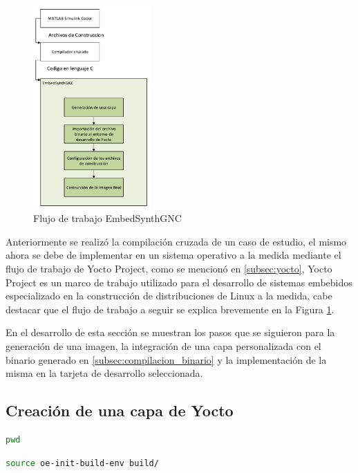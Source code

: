 \begin{figure}[h!]
    \centering
    \includegraphics[width=0.4\textwidth]{fig/especifico_2/embedsynthgnc/diagrama_general_embedsynthgnc.pdf}
    \caption{Flujo de trabajo EmbedSynthGNC}
    \label{fig:diagrama_embed_synth_gnc}
\end{figure}

Anteriormente se realizó la compilación cruzada de un caso de estudio, el mismo ahora se debe de implementar en un sistema operativo a la medida mediante el flujo de trabajo de Yocto Project, como se mencionó en \ref{subsec:yocto}, Yocto Project es un marco de trabajo utilizado para el desarrollo de sistemas embebidos especializado en la construcción de distribuciones de Linux a la medida, cabe destacar que el flujo de trabajo a seguir se explica brevemente en la Figura \ref{fig:diagrama_embed_synth_gnc}. 

En el desarrollo de esta sección se muestran los pasos que se siguieron para la generación de una imagen, la integración de una capa personalizada con el binario generado en \ref{subsec:compilacion_binario} y la implementación de la misma en la tarjeta de desarrollo seleccionada.

\subsection{Creación de una capa de Yocto}

\begin{lstlisting}[language=bash, caption={"Print Working Directory",Linux}, label=lst:pwd]
    pwd
\end{lstlisting}

\begin{lstlisting}[language=bash, caption={Inicializar ambiente, Yocto}, label=lst:yocto_ambient_set]
    source oe-init-build-env build/
\end{lstlisting}

